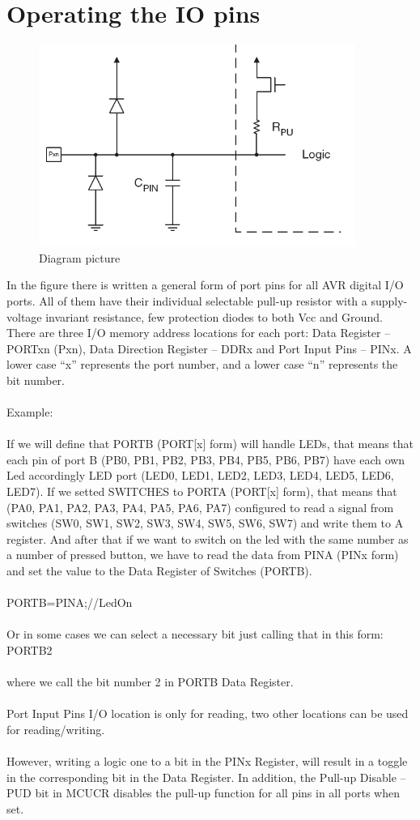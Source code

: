 \documentclass[english]{article}
\begin{document}
\section{Operating the IO pins}
\begin{figure}[H]
\centerline{\includegraphics[scale=0.8]{MicroLab3/diagram}}
\caption{Diagram picture}
\end{figure}
In the figure there is written a general form of port pins for all AVR digital I/O ports. All of them have their individual selectable pull-up resistor with a supply-voltage invariant resistance, few protection diodes to both Vcc and Ground. There are three I/O memory address locations for each port: Data Register – PORTxn (Pxn), Data Direction Register – DDRx and Port Input Pins – PINx. A lower case “x” represents the port number, and a lower case “n” represents the bit number.\\\\
Example:\\\\
If we will define that PORTB (PORT[x] form) will handle LEDs, that means that each pin of port B (PB0, PB1, PB2, PB3, PB4, PB5, PB6, PB7) have each own Led accordingly LED port (LED0, LED1, LED2, LED3, LED4, LED5, LED6, LED7). If we setted SWITCHES to PORTA (PORT[x] form), that means that (PA0, PA1, PA2, PA3, PA4, PA5, PA6, PA7) configured to read a signal from switches (SW0, SW1, SW2, SW3, SW4, SW5, SW6, SW7) and write them to A register. And after that if we want to switch on the led with the same number as a number of pressed button, we have to read the data from PINA (PINx form) and set the value to the Data Register of Switches (PORTB).\\\\
 PORTB=PINA;//LedOn\\\\
Or in some cases we can select a necessary bit just calling that in this form: PORTB2\\\\
where we call the bit number 2 in PORTB Data Register.\\\\
Port Input Pins I/O location is only for reading, two other locations can be used for reading/writing.\\\\
However, writing a logic one to a bit in the PINx Register, will result in a toggle in the corresponding bit in the Data Register. In addition, the Pull-up Disable – PUD bit in MCUCR disables the pull-up function for all pins in all ports when set.
\end{document}
